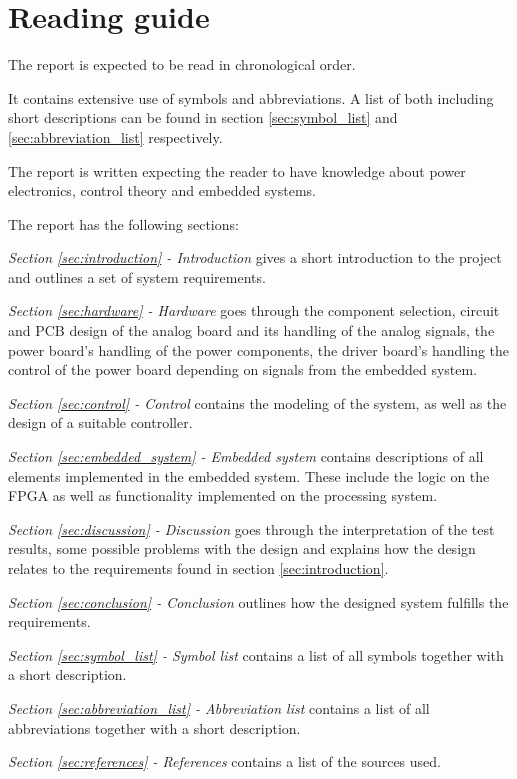 \section{Reading guide}
The report is expected to be read in chronological order. 

It contains extensive use of symbols and abbreviations. A list of both including short descriptions can be found in section \ref{sec:symbol_list} and \ref{sec:abbreviation_list} respectively. 

The report is written expecting the reader to have knowledge about power electronics, control theory and embedded systems.

\medskip
The report has the following sections:

\medskip
\emph{Section \ref{sec:introduction} - Introduction} gives a short introduction to the project and outlines a set of system requirements.

\medskip
\emph{Section \ref{sec:hardware} - Hardware} goes through the component selection, circuit and PCB design of the analog board and its handling of the analog signals, the power board's handling of the power components, the driver board's handling the control of the power board depending on signals from the embedded system.

\medskip
\emph{Section \ref{sec:control} - Control} contains the modeling of the system, as well as the design of a suitable controller. 

\medskip
\emph{Section \ref{sec:embedded_system} - Embedded system} contains descriptions of all elements implemented in the embedded system. These include the logic on the FPGA as well as functionality implemented on the processing system. 

\medskip
\emph{Section \ref{sec:discussion} - Discussion} goes through the interpretation of the test results, some possible problems with the design and explains how the design relates to the requirements found in section \ref{sec:introduction}.

\medskip
\emph{Section \ref{sec:conclusion} - Conclusion} outlines how the designed system fulfills the requirements.

\medskip
\emph{Section \ref{sec:symbol_list} - Symbol list} contains a list of all symbols together with a short description.

\medskip
\emph{Section \ref{sec:abbreviation_list} - Abbreviation list} contains a list of all abbreviations together with a short description.

\medskip
\emph{Section \ref{sec:references} - References} contains a list of the sources used.


